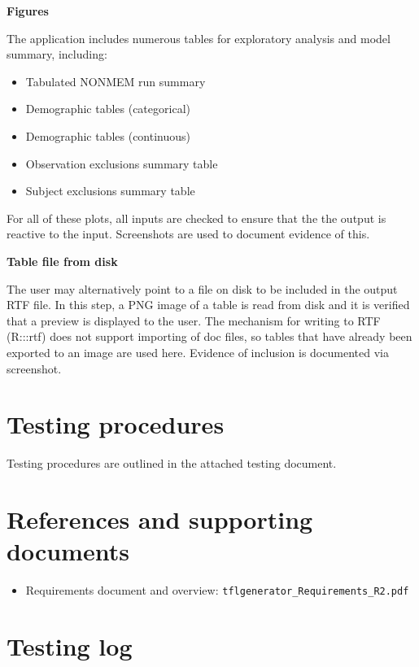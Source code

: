 \documentclass{article}
\newcommand{\testinglog}{tables-testing-log.pdf}
\begin{document}
{\bf Figures}

The application includes numerous tables for exploratory analysis and model summary, including:

\begin{itemize}
  \item Tabulated NONMEM run summary
  \item Demographic tables (categorical)
  \item Demographic tables (continuous)
  \item Observation exclusions summary table
  \item Subject exclusions summary table
\end{itemize}

For all of these plots, all inputs are checked to ensure that the the output is reactive to the input.  Screenshots are used to document evidence of this.

{\bf Table file from disk}

The user may alternatively point to a file on disk to be included in the output RTF file.  In this step, a PNG image of a table is read from disk and it is verified that a preview is displayed to the user.  The mechanism for writing to RTF (R:::rtf) does not support importing of doc files, so tables that have already been exported to an image are used here.  Evidence of inclusion is documented via screenshot.


\section*{Testing procedures}

Testing procedures are outlined in the attached testing document.


\section*{References and supporting documents}

\begin{itemize}
 \item Requirements document and overview: \verb=tflgenerator_Requirements_R2.pdf=
\end{itemize}

\section*{Testing log}


\end{document}
